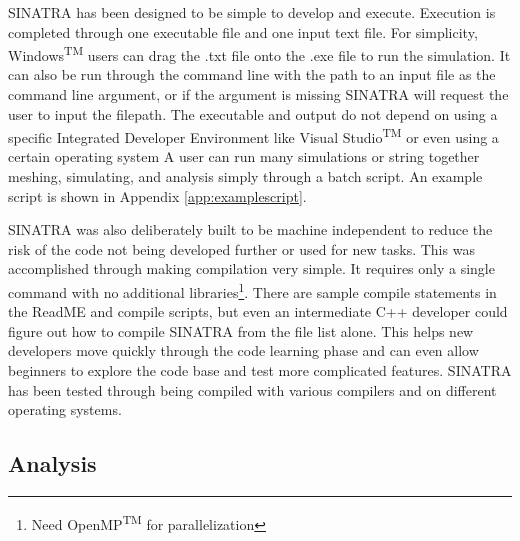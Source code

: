 SINATRA has been designed to be simple to develop and execute. Execution is completed through one executable file and one input text file. For simplicity, Windows\textsuperscript{TM} users can drag the .txt file onto the .exe file to run the simulation. It can also be run through the command line with the path to an input file as the command line argument, or if the argument is missing SINATRA will request the user to input the filepath. The executable and output do not depend on using a specific Integrated Developer Environment like Visual Studio\textsuperscript{TM} or even using a certain operating system A user can run many simulations or string together meshing, simulating, and analysis simply through a batch script. An example script is shown in Appendix \ref{app:examplescript}. \par
\indent SINATRA was also deliberately built to be machine independent to reduce the risk of the code not being developed further or used for new tasks. This was accomplished through making compilation very simple. It requires only a single command with no additional libraries\footnote{Need OpenMP\textsuperscript{TM} for parallelization}. There are sample compile statements in the ReadME and compile scripts, but even an intermediate C++ developer could figure out how to compile SINATRA from the file list alone. This helps new developers move quickly through the code learning phase and can even allow beginners to explore the code base and test more complicated features. SINATRA has been tested through being compiled with various compilers and on different operating systems. 



\subsection{Analysis}


